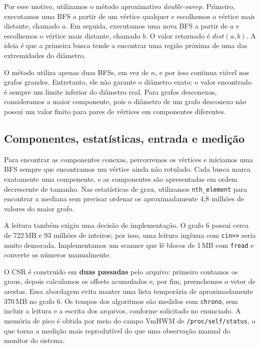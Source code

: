 \documentclass[11pt,a4paper]{article}
\begin{document}
Por esse motivo, utilizamos o m\'etodo aproximativo \textit{double-sweep}. Primeiro,
executamos uma BFS a partir de um v\'ertice qualquer e escolhemos o v\'ertice mais
distante, chamado $a$. Em seguida, executamos uma nova BFS a partir de $a$ e
escolhemos o v\'ertice mais distante, chamado $b$. O valor retornado \'e $dist(a,b)$.
A ideia \'e que a primeira busca tende a encontrar uma regi\~ao pr\'oxima de uma das
extremidades do di\^ametro.

O m\'etodo utiliza apenas duas BFSs, em vez de $n$, e por isso continua vi\'avel nos
grafos grandes. Entretanto, ele n\~ao garante o di\^ametro exato: o valor encontrado
\'e sempre um limite inferior do di\^ametro real. Para grafos desconexos, consideramos
a maior componente, pois o di\^ametro de um grafo desconexo n\~ao possui um valor finito
para pares de v\'ertices em componentes diferentes.

\subsection{Componentes, estat\'isticas, entrada e medi\c c\~ao}

Para encontrar as componentes conexas, percorremos os v\'ertices e iniciamos uma BFS
sempre que encontramos um v\'ertice ainda n\~ao rotulado. Cada busca marca exatamente
uma componente, e as componentes s\~ao apresentadas em ordem decrescente de tamanho.
Nas estat\'isticas de grau, utilizamos \texttt{nth\_element} para encontrar a mediana
sem precisar ordenar os aproximadamente 4,8 milh\~oes de valores do maior grafo.

A leitura tamb\'em exigiu uma decis\~ao de implementa\c c\~ao. O grafo 6 possui cerca de
722\,MB e 93 milh\~oes de inteiros; por isso, uma leitura ing\^enua com \texttt{cin>>}
seria muito demorada. Implementamos um scanner que l\^e blocos de 1\,MB com
\texttt{fread} e converte os n\'umeros manualmente.

O CSR \'e constru\'ido em \textbf{duas passadas} pelo arquivo: primeiro contamos os graus,
depois calculamos os offsets acumulados e, por fim, preenchemos o vetor de arestas.
Essa abordagem evita manter uma lista tempor\'aria de aproximadamente 370\,MB no grafo
6. Os tempos dos algoritmos s\~ao medidos com \texttt{chrono}, sem incluir a leitura e
a escrita dos arquivos, conforme solicitado no enunciado. A mem\'oria de pico \'e obtida
por meio do campo VmHWM de \texttt{/proc/self/status}, o que torna a medi\c c\~ao mais
reprodut\'ivel do que uma observa\c c\~ao manual do monitor do sistema.
\end{document}
